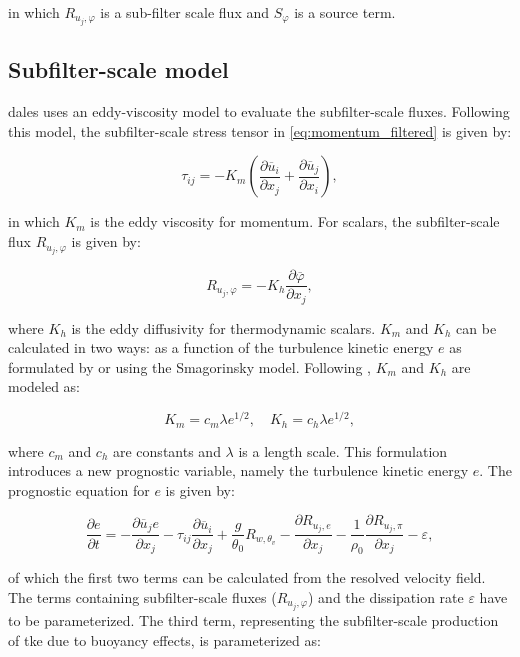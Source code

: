 in which $R_{u_j,\varphi}$ is a sub-filter scale flux and $S_\varphi$ is a source term.

\subsection{Subfilter-scale model}
\acrshort{dales} uses an eddy-viscosity model to evaluate the subfilter-scale fluxes. Following this model, the subfilter-scale stress tensor in \autoref{eq:momentum_filtered} is given by:

\begin{equation}
    \tau_{ij} = - K_m \left( \frac{\partial \overline{u}_i}{\partial x_j} + \frac{\partial \overline{u}_j}{\partial x_i} \right),
\end{equation}

in which $K_m$ is the eddy viscosity for momentum. For scalars, the subfilter-scale flux $R_{u_j,\varphi}$ is given by:

\begin{equation}
    R_{u_j,\varphi} = - K_h \frac{\partial \overline{\varphi}}{\partial x_j},
\end{equation}

where $K_h$ is the eddy diffusivity for thermodynamic scalars. $K_m$ and $K_h$ can be calculated in two ways: as a function of the turbulence kinetic energy $e$ as formulated by \citet{deardorffStratocumuluscappedMixedLayers1980} or using the Smagorinsky model. Following \citet{deardorffStratocumuluscappedMixedLayers1980}, $K_m$ and $K_h$ are modeled as:

\begin{equation}
    K_m = c_m \lambda e^{1/2}, \quad K_h = c_h \lambda e^{1/2},
\end{equation}

where $c_m$ and $c_h$ are constants and $\lambda$ is a length scale. This formulation introduces a new prognostic variable, namely the turbulence kinetic energy $e$. The prognostic equation for $e$ is given by:

\begin{equation}
    \frac{\partial e}{\partial t} = - \frac{\partial \overline{u}_j e}{\partial x_j} - \tau_{ij} \frac{\partial \overline{u}_i}{\partial x_j} + \frac{g}{\theta_0} R_{w,\theta_v} - \frac{\partial R_{u_j,e}}{\partial x_j} - \frac{1}{\rho_0} \frac{\partial R_{u_j,\pi}}{\partial x_j} - \varepsilon,
    \label{eq:deardorff_tke}
\end{equation}

of which the first two terms can be calculated from the resolved velocity field. The terms containing subfilter-scale fluxes ($R_{u_j,\varphi}$) and the dissipation rate $\varepsilon$ have to be parameterized. The third term, representing the subfilter-scale production of \acrshort{tke} due to buoyancy effects, is parameterized as:

